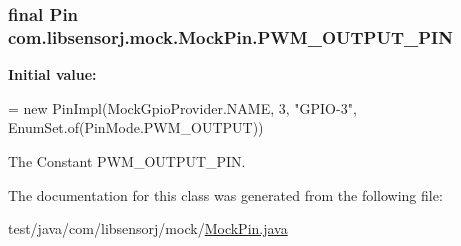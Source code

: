 \subsubsection[{P\+W\+M\+\_\+\+O\+U\+T\+P\+U\+T\+\_\+\+P\+I\+N}]{\setlength{\rightskip}{0pt plus 5cm}final Pin com.\+libsensorj.\+mock.\+Mock\+Pin.\+P\+W\+M\+\_\+\+O\+U\+T\+P\+U\+T\+\_\+\+P\+I\+N\hspace{0.3cm}{\ttfamily [static]}}\label{classcom_1_1libsensorj_1_1mock_1_1MockPin_af15fcc7a04ad7751ca96f968d1ac1b91}
{\bfseries Initial value\+:}
\begin{DoxyCode}
= \textcolor{keyword}{new} PinImpl(MockGpioProvider.NAME,
            3, \textcolor{stringliteral}{"GPIO-3"}, EnumSet.of(PinMode.PWM\_OUTPUT))
\end{DoxyCode}
The Constant P\+W\+M\+\_\+\+O\+U\+T\+P\+U\+T\+\_\+\+P\+I\+N. 

The documentation for this class was generated from the following file\+:\begin{DoxyCompactItemize}
\item 
test/java/com/libsensorj/mock/\hyperlink{MockPin_8java}{Mock\+Pin.\+java}\end{DoxyCompactItemize}
